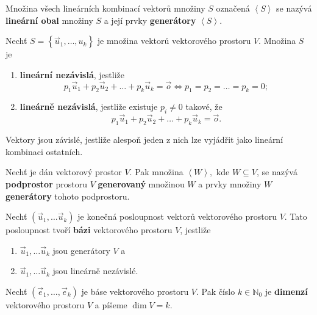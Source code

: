 \begin{definition}
    Množina všech lineárních kombinací vektorů množiny $S$ označená $\left < S \right >$ se nazývá \textbf{lineární
    obal} množiny $S$ a její prvky \textbf{generátory} $\left < S \right >$.
\end{definition}

\begin{definition}
    Nechť $S= \left \{ \vec u_1, \dots, u_k \right \} $ je množina vektorů vektorového prostoru $V$. Množina $S$ je
   	\begin{enumerate}[$i.$]
    \item \textbf{lineární nezávislá}, jestliže
    $$p_1\vec u_1 + p_2\vec u_2 + \dots + p_k\vec u_k = \vec o \iff p_1 = p_2 = \dots = p_k = 0;$$
   	\item \textbf{lineárně nezávislá}, jestliže existuje $p_i\ne 0$ takové, že
    $$ p_1\vec u_1 + p_2\vec u_2 + \dots + p_k\vec u_k = \vec o.$$
    \end{enumerate}
\end{definition}

\begin{veta}
    Vektory jsou závislé, jestliže alespoň jeden z nich lze vyjádřit jako lineární
    kombinaci ostatních.
\end{veta}

\begin{definition}
    Nechť je dán vektorový prostor $V$. Pak množina $\left < W \right >,$ kde $
    W\subseteq V$, se nazývá \textbf{podprostor} prostoru $V$ \textbf{generovaný}
    množinou $W$ a prvky množiny $W$ \textbf{generátory} tohoto podprostoru.
\end{definition}

\begin{definition}
    Nechť $(\vec u_1, \dots \vec u_k)$ je konečná posloupnost vektorů vektorového
    prostoru $V$. Tato posloupnost tvoří \textbf{bázi} vektorového prostoru $V$, jestliže
    \begin{enumerate}[$i.$]
    \item $\vec u_1, \dots \vec u_k$ jsou generátory $V$ a
   	\item $\vec u_1, \dots \vec u_k$ jsou lineárně nezávislé.
    \end{enumerate}
\end{definition}

\begin{definition}
Nechť $(\vec e_1,\dots, \vec e_k)$ je báse vektorového prostoru $V$. Pak číslo $k \in
\mathbb N_0$ je \textbf{dimenzí} vektorového prostoru $V$ a píšeme $\dim V=k$.
\end{definition}

